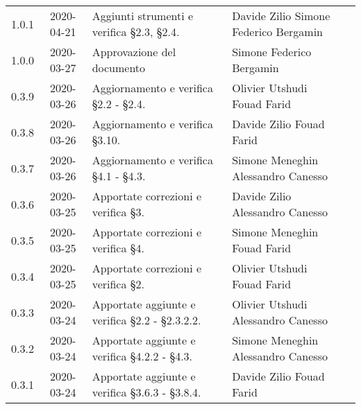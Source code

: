 {\begin{longtable}{ c c  C{4cm}  C{3.8cm}  C{3cm} }
	1.0.1 & 2020-04-21 & Aggiunti strumenti e verifica \S 2.3, \S 2.4. & Davide Zilio \newline Simone Federico Bergamin &\adm{} \newline  \ver{}\\	
    1.0.0 & 2020-03-27 & Approvazione del documento & Simone Federico Bergamin &\Res{} \\
    	0.3.9 & 2020-03-26 & Aggiornamento e verifica \S 2.2 - \S 2.4. & Olivier Utshudi \newline Fouad Farid &\adm{} \newline  \ver{}\\
		0.3.8 & 2020-03-26 & Aggiornamento e verifica \S 3.10. & Davide Zilio \newline Fouad Farid &\adm{} \newline  \ver{}\\
		0.3.7 & 2020-03-26 & Aggiornamento e verifica \S 4.1 - \S 4.3. & Simone Meneghin \newline Alessandro Canesso &\adm{} \newline  \ver{}\\
		0.3.6 & 2020-03-25 & Apportate correzioni e verifica \S 3. & Davide Zilio \newline Alessandro Canesso &\adm{} \newline  \ver{}\\
    	0.3.5 & 2020-03-25 & Apportate correzioni e verifica \S 4.  & Simone Meneghin \newline Fouad Farid &\adm{} \newline  \ver{}\\	
   		0.3.4 & 2020-03-25 & Apportate correzioni e verifica \S 2. & Olivier Utshudi \newline Fouad Farid &\adm{} \newline  \ver{}\\
		0.3.3 & 2020-03-24 & Apportate aggiunte e verifica \S 2.2 - \S 2.3.2.2. & Olivier Utshudi \newline Alessandro Canesso &\adm{} \newline  \ver{}\\
		0.3.2 & 2020-03-24 & Apportate aggiunte e verifica \S 4.2.2 - \S 4.3. & Simone Meneghin \newline Alessandro Canesso &\adm{} \newline  \ver{}\\		
		0.3.1 & 2020-03-24 & Apportate aggiunte e verifica \S 3.6.3 - \S 3.8.4.& Davide Zilio \newline Fouad Farid &\adm{} \newline  \ver{}\\

\end{longtable}}
